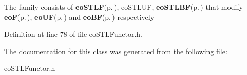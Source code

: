 The family consists of {\bf eo\-STLF}{\rm (p.\,\pageref{classeo_s_t_l_f})}, eo\-STLUF, {\bf eo\-STLBF}{\rm (p.\,\pageref{classeo_s_t_l_b_f})} that modify {\bf eo\-F}{\rm (p.\,\pageref{classeo_f})}, {\bf eo\-UF}{\rm (p.\,\pageref{classeo_u_f})} and {\bf eo\-BF}{\rm (p.\,\pageref{classeo_b_f})} respectively 



Definition at line 78 of file eo\-STLFunctor.h.

The documentation for this class was generated from the following file:\begin{CompactItemize}
\item 
eo\-STLFunctor.h\end{CompactItemize}
